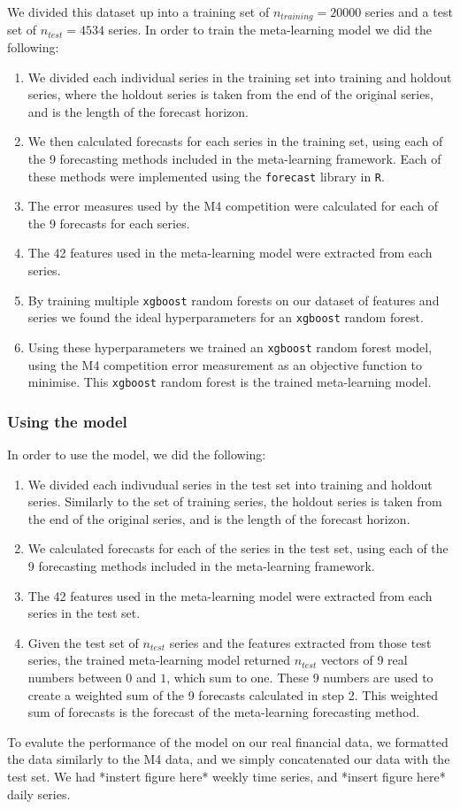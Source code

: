 \documentclass[a4paper,12pt]{article}
\theoremstyle{definition}
\begin{document}
We divided this dataset up into a training set of $n_{training} = 20000$ series and a test set of $n_{test} = 4534$ series. In order to train the meta-learning model we did the following: 
\begin{enumerate}
	\item We divided each individual series in the training set into training and holdout series, where the holdout series is taken from the end of the original series, and is the length of the forecast horizon.
	\item We then calculated forecasts for each series in the training set, using each of the 9 forecasting methods included in the meta-learning framework. Each of these methods were implemented using the \texttt{forecast} library in \texttt{R}.
	\item The error measures used by the M4 competition were calculated for each of the 9 forecasts for each series.
	\item The 42 features used in the meta-learning model were extracted from each series.
	\item By training multiple \texttt{xgboost} random forests on our dataset of features and series we found the ideal hyperparameters for an \texttt{xgboost} random forest.
	\item Using these hyperparameters we trained an \texttt{xgboost} random forest model, using the M4 competition error measurement as an objective function to minimise. This \texttt{xgboost} random forest is the trained meta-learning model.
\end{enumerate}

\subsubsection{Using the model}\label{sec:using}
In order to use the model, we did the following:
\begin{enumerate}
	\item We divided each indivudual series in the test set into training and holdout series. Similarly to the set of training series, the holdout series is taken from the end of the original series, and is the length of the forecast horizon.
	\item We calculated forecasts for each of the series in the test set, using each of the 9 forecasting methods included in the meta-learning framework.
	\item The 42 features used in the meta-learning model were extracted from each series in the test set.
	\item Given the test set of $n_{test}$ series and the features extracted from those test series, the trained meta-learning model returned $n_{test}$ vectors of 9 real numbers between $0$ and $1$, which sum to one. These 9 numbers are used to create a weighted sum of the 9 forecasts calculated in step 2. This weighted sum of forecasts is the forecast of the meta-learning forecasting method.
\end{enumerate}
To evalute the performance of the model on our real financial data, we formatted the data similarly to the M4 data, and we simply concatenated our data with the test set. We had *instert figure here* weekly time series, and *insert figure here* daily series.
\end{document}
